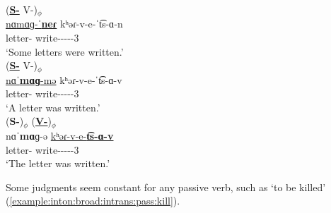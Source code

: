 \begin{exe}
	\ex \begin{xlist}
		\ex \glll  (\textbf{\underline{S-{\pl}}} V-{\pass})$_\phi$ \\
		\underline{nɑ{mɑɡ}-ˈ\textbf{neɾ}} kʰəɾ-v-e-ˈ{t͡s-ɑ-n} \\
		letter-{\pl} write-{\pass}-{\thgloss}-{\aorperf}-{\pst}-3{\pl} \\
		\trans `Some letters were written.' \label{example:inton:broad:intrans:pass:pl}
		\\ 
		\ex \glll  (\textbf{\underline{S-{\indf}}} V-{\pass})$_\phi$ \\
		\underline{nɑˈ\textbf{mɑɡ}-mə} kʰəɾ-v-e-ˈ{t͡s-ɑ-v} \\
		letter-{\indf} write-{\pass}-{\thgloss}-{\aorperf}-{\pst}-3{\sg} \\
		\trans `A letter was  written.'\label{example:inton:broad:intrans:pass:indf}
		\\ 
		\ex \glll (\textbf{{S-{}}})$_\phi$ (\textbf{\underline{V-{\pass}}})$_\phi$ \\
		{{nɑˈ\textbf{mɑ}ɡ-ə}} \underline{kʰəɾ-v-e-\textbf{t͡s-ɑ-v}} \\ 
		letter-{} write-{\pass}-{\thgloss}-{\aorperf}-{\pst}-3{\sg} \\
		\trans `The letter was written.'\label{example:inton:broad:intrans:pass:def}
		\\  
		
	\end{xlist}
\end{exe}

Some judgments seem constant for any passive verb, such as `to be killed' (\ref{example:inton:broad:intrans:pass:kill}). 


